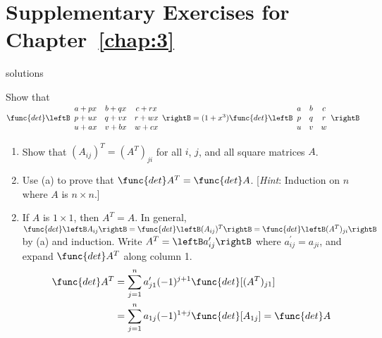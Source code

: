 \section*{Supplementary Exercises for Chapter~\ref{chap:3}}

\begin{Filesave}{solutions}
\end{Filesave}

\begin{multicols}{2}
\begin{supex}
Show that
\\ {\footnotesize$\func{det} \leftB \begin{array}{ccc}
a+px & b+qx & c+rx \\
p+ux & q+vx & r+wx \\
u+ax & v+bx & w+cx \\
\end{array} \rightB = (1+x^3) \func{det} \leftB \begin{array}{ccc}
a & b & c \\
p & q & r \\
u & v & w
\end{array}\rightB$}
\end{supex}


\begin{supex}

\begin{enumerate}[label={\alph*.}]
\item Show that $(A_{ij})^{T} = (A^{T})_{ji}$ for all $i$, $j$, and all square matrices $A$.

\item Use (a) to prove that $\func{det }A^{T} = \func{det }A$. [\textit{Hint}: Induction on $n$ where $A$ is $n \times n$.]

\end{enumerate}
\begin{supsol}
\begin{enumerate}[label={\alph*.}]
\setcounter{enumi}{1}
\item If $A$ is $1 \times 1$, then $A^{T} = A$. In general, $\func{det}\leftB A_{ij} \rightB = \func{det}\leftB (A_{ij})^{T}\rightB = \func{det}\leftB(A^{T})_{ji} \rightB$ by (a) and induction. Write $A^{T} = \leftB a^\prime_{ij}\rightB$ where $a^\prime_{ij} = a_{ji}$, and expand $\func{det }A^{T}$ along column 1.
\begin{align*}
\func{det } A^T &= \sum_{j=1}^{n} a^{\prime}_{j1}(-1)^{j+1} \func{det}[(A^T)_{j1}] \\
&= \sum_{j=1}^{n} a_{1j}(-1)^{1+j} \func{det}[A_{1j}] = \func{det }A
\end{align*}


\end{enumerate}
\end{supsol}
\end{supex}
\end{multicols}
